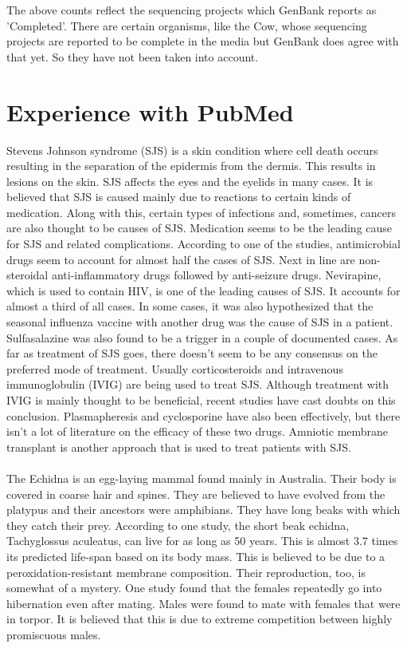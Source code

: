 \documentclass{article}
\begin{document}
The above counts reflect the sequencing projects which GenBank reports as 'Completed'. There are certain organisms, like the Cow, whose sequencing projects are reported to be complete in the media but GenBank does agree with that yet. So they have not been taken into account.
\clearpage

\section{Experience with PubMed}
Stevens Johnson syndrome (SJS) is a skin condition where cell death occurs resulting in the separation of the epidermis from the dermis. This results in lesions on the skin. SJS affects the eyes and the eyelids in many cases. It is believed that SJS is caused mainly due to reactions to certain kinds of medication. Along with this, certain types of infections and, sometimes, cancers are also thought to be causes of SJS. Medication seems to be the leading cause for SJS and related complications. According to one of the studies, antimicrobial drugs seem to account for almost half the cases of SJS. Next in line are non-steroidal anti-inflammatory drugs followed by anti-seizure drugs. Nevirapine, which is used to contain HIV, is one of the leading causes of SJS. It accounts for almost a third of all cases. In some cases, it was also hypothesized that the seasonal influenza vaccine with another drug was the cause of SJS in a patient. Sulfasalazine was also found to be a trigger in a couple of documented cases. 
As far as treatment of SJS goes, there doesn't seem to be any consensus on the preferred mode of treatment. Usually corticosteroids and intravenous immunoglobulin (IVIG) are being used to treat SJS. Although treatment with IVIG is mainly thought to be beneficial, recent studies have cast doubts on this conclusion. Plasmapheresis and cyclosporine have also been effectively, but there isn't a lot of literature on the efficacy of these two drugs. Amniotic membrane transplant is another approach that is used to treat patients with SJS. \\
\\
The Echidna is an egg-laying mammal found mainly in Australia. Their body is covered in coarse hair and spines. They are believed to have evolved from the platypus and their ancestors were amphibians. They have long beaks with which they catch their prey. According to one study, the short beak echidna, Tachyglossus aculeatus, can live for as long as 50 years. This is almost 3.7 times its predicted life-span based on its body mass. This is believed to be due to a peroxidation-resistant membrane composition. Their reproduction, too, is somewhat of a mystery. One study found that the females repeatedly go into hibernation even after mating. Males were found to mate with females that were in torpor. It is believed that this is due to extreme competition between highly promiscuous males. \\
\end{document}
